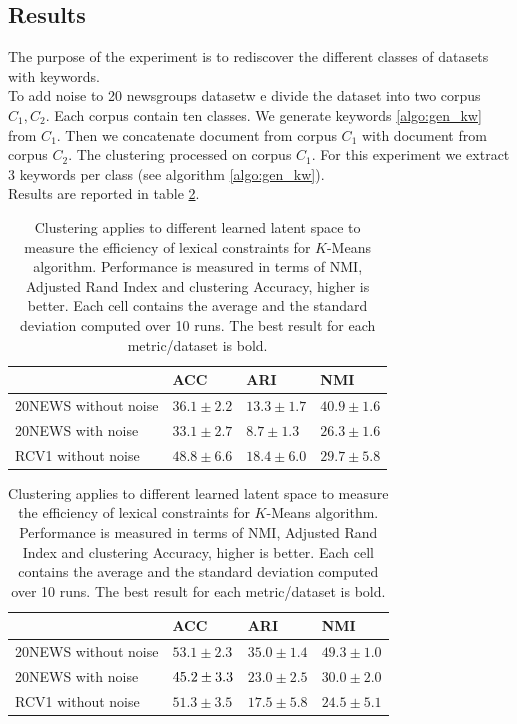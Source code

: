 \subsection{Results}
The purpose of the experiment is to rediscover the different classes of 
datasets with keywords.\\
To add noise to 20 newsgroups datasetw e divide the dataset into two corpus $C_1, C_2$. 
Each corpus contain ten classes. We generate keywords \ref{algo:gen_kw} 
from $C_1$. Then we concatenate document from corpus $C_1$ with document
from corpus $C_2$. The clustering processed on corpus $C_1$. For this experiment
we extract 3 keywords per class (see algorithm \ref{algo:gen_kw}).
\\Results are reported in table \ref{tab:res}.
\begin{table}[h]
\caption{\label{tab:res}Clustering applies to 
different learned latent space to measure the efficiency of lexical constraints
for $K$-Means algorithm. Performance is measured in terms of NMI, Adjusted Rand 
Index and clustering Accuracy, higher is better. Each cell contains the average
and the standard deviation computed over 10 runs. The best result for each 
metric/dataset is bold.}
\centering
  \begin{tabular}{|l|l|l|l|}
    \hline
    & ACC          &ARI           & NMI           \\ \hline
    20NEWS without noise   &$36.1 \pm 2.2$&$13.3 \pm 1.7$&$40.9 \pm 1.6$ \\ \hline
    20NEWS with noise      &$33.1 \pm 2.7$&$8.7 \pm 1.3$ &$26.3 \pm 1.6$ \\ \hline
    RCV1 without noise     &$48.8 \pm 6.6$&$18.4 \pm 6.0$&$29.7 \pm 5.8$ \\ \hline
  \end{tabular}
  \begin{tabular}{|l|l|l|l|}
    \hline
    & ACC          &ARI           & NMI           \\ \hline
    20NEWS without noise   &$53.1 \pm 2.3$&$35.0 \pm 1.4$&$49.3 \pm 1.0$ \\ \hline
    20NEWS with noise      &$\boldmath45.2 \pm 3.3$&$23.0 \pm 2.5$ &$30.0 \pm 2.0$ \\ \hline
    RCV1 without noise     &$51.3 \pm 3.5$&$17.5 \pm 5.8$&$24.5 \pm 5.1$ \\ \hline
  \end{tabular}

\end{table}
